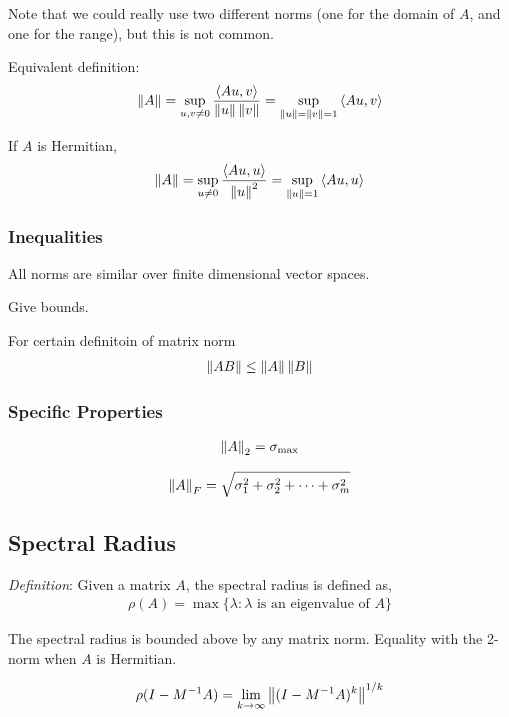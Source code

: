 \documentclass[12pt]{article}
\begin{document}
Note that we could really use two different norms (one for the domain of \( A \), and one for the range), but this is not common.

Equivalent definition:
\begin{align*}
    \left\lVert A\right\rVert = \sup_{u,v\neq 0} \frac{\left\langle Au,v \right\rangle}{\left\lVert u\right\rVert\left\lVert v\right\rVert} = \sup_{\left\lVert u\right\rVert=\left\lVert v\right\rVert=1} \left\langle Au,v \right\rangle
\end{align*}
 
If \( A \) is Hermitian,
\begin{align*}
    \left\lVert A\right\rVert = \sup_{u\neq 0} \frac{\left\langle Au,u \right\rangle}{\left\lVert u\right\rVert^2} = \sup_{\left\lVert u\right\rVert=1} \left\langle Au,u \right\rangle
\end{align*}


\subsubsection{Inequalities}

All norms are similar over finite dimensional vector spaces.

Give bounds.

For certain definitoin of matrix norm
\begin{align*}
    \left\lVert A B\right\rVert \leq \left\lVert A\right\rVert\left\lVert B\right\rVert
\end{align*}


\subsubsection{Specific Properties}
\begin{align*}
    \left\lVert A\right\rVert_2 = \sigma_{\text{max}}
\end{align*}

\begin{align*}
    \left\lVert A\right\rVert_F = \sqrt{\sigma_1^2 + \sigma_2^2 + \cdots + \sigma_m^2}
\end{align*}


\subsection{Spectral Radius}
\textit{Definition}: Given a matrix \( A \), the spectral radius is defined as,
\begin{align*}
    \rho(A) = \max \{ \lambda : \lambda \text{ is an eigenvalue of } A \}
\end{align*}

The spectral radius is bounded above by any matrix norm. Equality with the 2-norm when \( A \) is Hermitian.

\begin{align*}
    \rho(I-M^{-1}A) = \lim_{k\to\infty} \left\lVert(I-M^{-1}A)^k\right\rVert^{1/k}
\end{align*}
\end{document}
